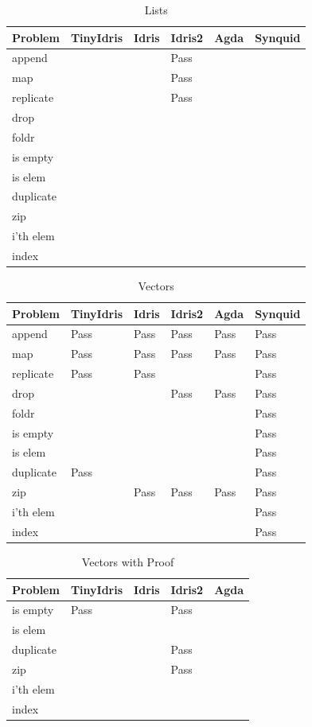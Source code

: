 \documentclass[a4paper]{article}
\begin{document}
\begin{center}
  
\begin{table}[!htbp]
\begin{tabular}{|l|l|l|l|l|l|}
\hline
Problem & TinyIdris & Idris & Idris2 & Agda & Synquid \\
\hline
append &   &   & Pass &  &  \\
map &   &   & Pass &  & \\
replicate &   &   & Pass &  & \\
drop &   &   &   &  &   \\
foldr &   &   &   & &  \\
is empty &   &   &   &  & \\
is elem &   &   &   & &  \\
duplicate &   &   &   & &  \\
zip &   &   &   & & \\
i'th elem &   &   &   & & \\
index &   &   &   & & \\
\hline
\end{tabular}
\caption{Lists}
\end{table}


\begin{table}[!htbp]
\begin{tabular}{|l|l|l|l|l|l|}
\hline
Problem & TinyIdris & Idris & Idris2 & Agda & Synquid \\
\hline
append & Pass & Pass & Pass & Pass & Pass\\
map & Pass  & Pass & Pass & Pass & Pass\\
replicate & Pass & Pass & &   & Pass\\
drop &   &   & Pass & Pass  & Pass\\
foldr &   &   &   &   & Pass\\
is empty &   &   &   &   & Pass\\
is elem &   &   &   &   & Pass\\
duplicate & Pass &   &   &   & Pass\\
zip &   & Pass & Pass & Pass  & Pass\\
i'th elem &   &   &   &   & Pass\\
index &   &   &   &   & Pass\\
\hline
\end{tabular}
\caption{Vectors}
\end{table}

\begin{table}[!htbp]
\begin{tabular}{|l|l|l|l|l|}
\hline
Problem & TinyIdris & Idris & Idris2 & Agda\\
\hline
is empty & Pass &   & Pass &  \\
is elem &   &   &   &  \\
duplicate &   &   & Pass &  \\
zip &   &   & Pass &  \\
i'th elem &   &   &   &  \\
index &   &   &   &  \\
\hline
\end{tabular}
\caption{Vectors with Proof}
\end{table}


\end{center}
\end{document}
